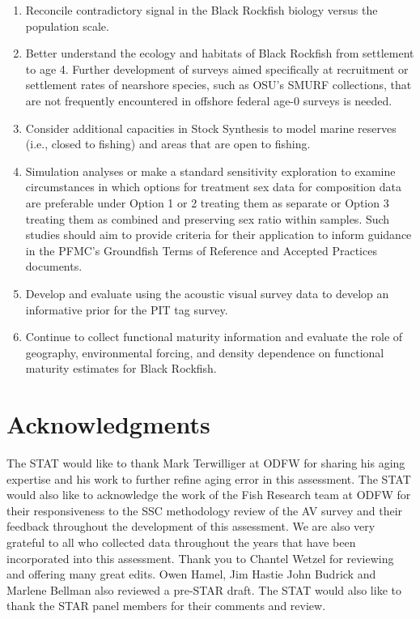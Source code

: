 \documentclass[11pt,
  english,
  letterpaper,
]{article}
\begin{document}
\begin{enumerate}
\item
  Reconcile contradictory signal in the Black Rockfish biology versus the population scale.
\item
  Better understand the ecology and habitats of Black Rockfish from settlement to age 4. Further development of surveys aimed specifically at recruitment or settlement rates of nearshore species, such as OSU's SMURF collections, that are not frequently encountered in offshore federal age-0 surveys is needed.
\item
  Consider additional capacities in Stock Synthesis to model marine reserves (i.e., closed to fishing) and areas that are open to fishing.
\item
  Simulation analyses or make a standard sensitivity exploration to examine circumstances in which options for treatment sex data for composition data are preferable under Option 1 or 2 treating them as separate or Option 3 treating them as combined and preserving sex ratio within samples. Such studies should aim to provide criteria for their application to inform guidance in the PFMC's Groundfish Terms of Reference and Accepted Practices documents.
\item
  Develop and evaluate using the acoustic visual survey data to develop an informative prior for the PIT tag survey.
\item
  Continue to collect functional maturity information and evaluate the role of geography, environmental forcing, and density dependence on functional maturity estimates for Black Rockfish.
\end{enumerate}

\hypertarget{acknowledgments}{%
\section{Acknowledgments}\label{acknowledgments}}

The STAT would like to thank Mark Terwilliger at ODFW for sharing his aging expertise and his work to further refine aging error in this assessment. The STAT would also like to acknowledge the work of the Fish Research team at ODFW for their responsiveness to the SSC methodology review of the AV survey and their feedback throughout the development of this assessment. We are also very grateful to all who collected data throughout the years that have been incorporated into this assessment. Thank you to Chantel Wetzel for reviewing and offering many great edits. Owen Hamel, Jim Hastie John Budrick and Marlene Bellman also reviewed a pre-STAR draft. The STAT would also like to thank the STAR panel members for their comments and review.
\end{document}
